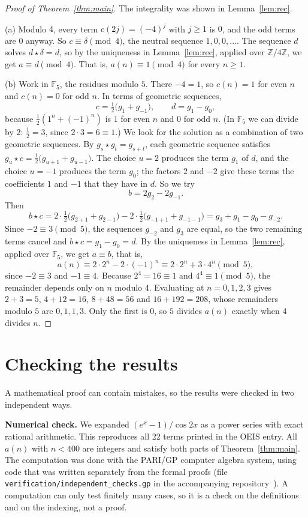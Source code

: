 \documentclass[11pt,a4paper]{article}
\theoremstyle{definition}
\theoremstyle{remark}
\newcommand{\Z}{\mathbb{Z}}
\newcommand{\F}{\mathbb{F}}
\newcommand{\para}[1]{\par\medskip\noindent\textbf{#1}\enspace}
\begin{document}
\begin{proof}[Proof of Theorem~\ref{thm:main}]
The integrality was shown in Lemma~\ref{lem:rec}.

(a) Modulo $4$, every term $c(2j)=(-4)^j$ with $j\ge1$ is $0$, and the odd terms are $0$ anyway. So $c\equiv\delta\pmod4$,
the neutral sequence $1,0,0,\dots$. The sequence $d$ solves $d\star\delta=d$, so by the uniqueness in
Lemma~\ref{lem:rec}, applied over $\Z/4\Z$, we get $a\equiv d\pmod4$. That is, $a(n)\equiv1\pmod4$ for every $n\ge1$.

(b) Work in $\F_5$, the residues modulo $5$. There $-4=1$, so $c(n)=1$ for even $n$ and $c(n)=0$ for odd $n$. In terms of
geometric sequences,
\[
c=\tfrac12\bigl(g_1+g_{-1}\bigr),\qquad d=g_1-g_0,
\]
because $\frac12(1^n+(-1)^n)$ is $1$ for even $n$ and $0$ for odd $n$. (In $\F_5$ we can divide by $2$: $\frac12=3$,
since $2\cdot3=6\equiv1$.) We look for the solution as a combination of two geometric sequences. By
$g_s\star g_t=g_{s+t}$, each geometric sequence satisfies $g_u\star c=\frac12\bigl(g_{u+1}+g_{u-1}\bigr)$. The choice
$u=2$ produces the term $g_1$ of $d$, and the choice $u=-1$ produces the term $g_0$; the factors $2$ and $-2$ give these
terms the coefficients $1$ and $-1$ that they have in $d$. So we try
\[
b=2g_2-2g_{-1}.
\]
Then
\[
b\star c=2\cdot\tfrac12\bigl(g_{2+1}+g_{2-1}\bigr)-2\cdot\tfrac12\bigl(g_{-1+1}+g_{-1-1}\bigr)
=g_3+g_1-g_0-g_{-2}.
\]
Since $-2\equiv3\pmod5$, the sequences $g_{-2}$ and $g_3$ are equal, so the two remaining terms cancel and
$b\star c=g_1-g_0=d$. By the uniqueness in
Lemma~\ref{lem:rec}, applied over $\F_5$, we get $a\equiv b$, that is,
\[
a(n)\equiv2\cdot2^n-2\cdot(-1)^n\equiv2\cdot2^n+3\cdot4^n\pmod5,
\]
since $-2\equiv3$ and $-1\equiv4$. Because $2^4=16\equiv1$ and $4^4\equiv1\pmod5$, the remainder depends only on $n$
modulo $4$. Evaluating at $n=0,1,2,3$ gives $2+3=5$, $4+12=16$, $8+48=56$ and $16+192=208$, whose remainders modulo $5$ are
$0,1,1,3$. Only the first is $0$, so $5$ divides $a(n)$ exactly when $4$ divides $n$.
\end{proof}

\section{Checking the results}\label{sec:checks}

A mathematical proof can contain mistakes, so the results were checked in two independent ways.

\para{Numerical check.}
We expanded $(e^x-1)/\cos2x$ as a power series with exact rational arithmetic. This reproduces all 22 terms printed
in the OEIS entry. All $a(n)$ with $n<400$ are integers and satisfy both parts of Theorem~\ref{thm:main}.
The computation was done with the PARI/GP computer algebra system, using code that was written separately from the
formal proofs (file \texttt{verification/independent\_checks.gp} in the accompanying repository~\cite{repo}).
A computation can only test finitely many cases, so it is a check on the definitions and on the indexing, not a proof.
\end{document}
